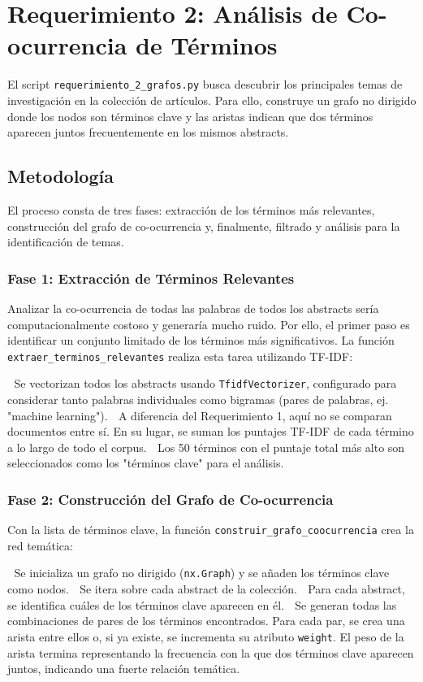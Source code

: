 \documentclass[10pt,a4paper]{article}
\begin{document}
\newpage
\section{Requerimiento 2: Análisis de Co-ocurrencia de Términos}
El script \texttt{requerimiento\_2\_grafos.py} busca descubrir los principales temas de investigación en la colección de artículos. Para ello, construye un grafo no dirigido donde los nodos son términos clave y las aristas indican que dos términos aparecen juntos frecuentemente en los mismos abstracts.

\subsection{Metodología}
El proceso consta de tres fases: extracción de los términos más relevantes, construcción del grafo de co-ocurrencia y, finalmente, filtrado y análisis para la identificación de temas.

\subsubsection{Fase 1: Extracción de Términos Relevantes}
Analizar la co-ocurrencia de todas las palabras de todos los abstracts sería computacionalmente costoso y generaría mucho ruido. Por ello, el primer paso es identificar un conjunto limitado de los términos más significativos. La función \texttt{extraer\_terminos\_relevantes} realiza esta tarea utilizando TF-IDF:
\begin{enumerate}
     Se vectorizan todos los abstracts usando \texttt{TfidfVectorizer}, configurado para considerar tanto palabras individuales como bigramas (pares de palabras, ej. "machine learning").
     A diferencia del Requerimiento 1, aquí no se comparan documentos entre sí. En su lugar, se suman los puntajes TF-IDF de cada término a lo largo de todo el corpus.
     Los 50 términos con el puntaje total más alto son seleccionados como los "términos clave" para el análisis.
\end{enumerate}

\subsubsection{Fase 2: Construcción del Grafo de Co-ocurrencia}
Con la lista de términos clave, la función \texttt{construir\_grafo\_coocurrencia} crea la red temática:
\begin{itemize}
     Se inicializa un grafo no dirigido (\texttt{nx.Graph}) y se añaden los términos clave como nodos.
     Se itera sobre cada abstract de la colección.
     Para cada abstract, se identifica cuáles de los términos clave aparecen en él.
     Se generan todas las combinaciones de pares de los términos encontrados. Para cada par, se crea una arista entre ellos o, si ya existe, se incrementa su atributo \texttt{weight}. El peso de la arista termina representando la frecuencia con la que dos términos clave aparecen juntos, indicando una fuerte relación temática.
\end{itemize}
\end{document}
